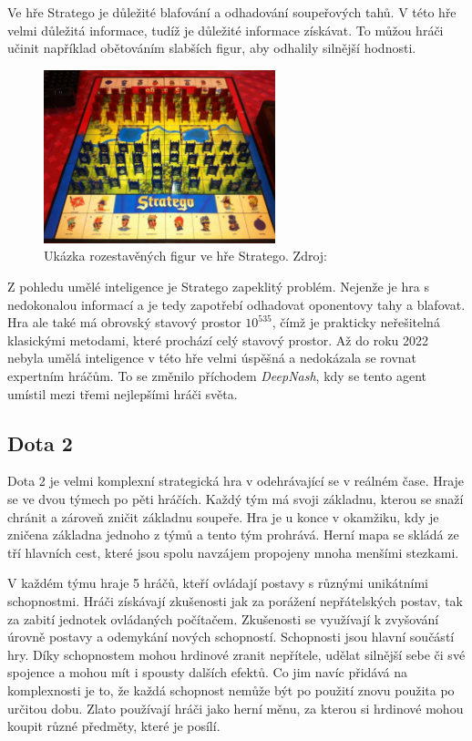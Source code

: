 Ve hře Stratego je důležité blafování a odhadování soupeřových tahů.
V této hře velmi důležitá informace, tudíž je důležité informace získávat.
To můžou hráči učinit například obětováním slabších figur, aby odhalily silnější hodnosti.

\begin{figure}[H]
	\centering
	\includegraphics[width=0.6\textwidth]{obrazky-figures/stratego}
	\caption{Ukázka rozestavěných figur ve hře Stratego.
  Zdroj: \cite{Stratego_image}}\label{fig:figure2}
\end{figure}

Z pohledu umělé inteligence je Stratego zapeklitý problém.
Nejenže je hra s nedokonalou informací a je tedy zapotřebí odhadovat oponentovy tahy a blafovat.
Hra ale také má obrovský stavový prostor $10^{535}$\cite{Perolat_2022}, čímž je prakticky neřešitelná klasickými metodami, které prochází celý stavový prostor.
Až do roku 2022 nebyla umělá inteligence v této hře velmi úspěšná a nedokázala se rovnat expertním hráčům.
To se změnilo příchodem \emph{DeepNash}\cite{Perolat_2022}, kdy se tento agent umístil mezi třemi nejlepšími hráči světa.

\subsection{Dota 2}\label{subsec:dota}
Dota 2 je velmi komplexní strategická hra v odehrávající se v reálném čase.
Hraje se ve dvou týmech po pěti hráčích.
Každý tým má svoji základnu, kterou se snaží chránit a zároveň zničit základnu soupeře.
Hra je u konce v okamžiku, kdy je zničena základna jednoho z týmů a tento tým prohrává.
Herní mapa se skládá ze tří hlavních cest, které jsou spolu navzájem propojeny mnoha menšími stezkami.

V každém týmu hraje 5 hráčů, kteří ovládají postavy s různými unikátními schopnostmi.
Hráči získávají zkušenosti jak za porážení nepřátelských postav, tak za zabití jednotek ovládaných počítačem.
Zkušenosti se využívají k zvyšování úrovně postavy a odemykání nových schopností.
Schopnosti jsou hlavní součástí hry.
Díky schopnostem mohou hrdinové zranit nepřítele, udělat silnější sebe či své spojence a mohou mít i spousty dalších efektů.
Co jim navíc přidává na komplexnosti je to, že každá schopnost nemůže být po použití znovu použita po určitou dobu.
Zlato používají hráči jako herní měnu, za kterou si hrdinové mohou koupit různé předměty, které je posílí.

